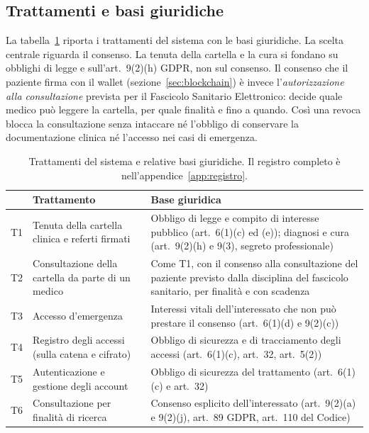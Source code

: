 \subsection{Trattamenti e basi giuridiche}\label{sec:basi}
La tabella~\ref{tab:basi} riporta i trattamenti del sistema con le basi giuridiche. La scelta centrale riguarda il consenso. La tenuta della cartella e la cura si fondano su obblighi di legge e sull'art.~9(2)(h) GDPR, non sul consenso. Il consenso che il paziente firma con il wallet (sezione~\ref{sec:blockchain}) è invece l'\emph{autorizzazione alla consultazione} prevista per il Fascicolo Sanitario Elettronico: decide quale medico può leggere la cartella, per quale finalità e fino a quando. Così una revoca blocca la consultazione senza intaccare né l'obbligo di conservare la documentazione clinica né l'accesso nei casi di emergenza.

\begin{table}[H]
\centering\footnotesize
\renewcommand{\arraystretch}{1.2}
\begin{tabular}{@{}l p{} p{}@{}}
\toprule
& Trattamento & Base giuridica\\
\midrule
T1 & Tenuta della cartella clinica e referti firmati & Obbligo di legge e compito di interesse pubblico (art.~6(1)(c) ed (e)); diagnosi e cura (art.~9(2)(h) e 9(3), segreto professionale)\\
T2 & Consultazione della cartella da parte di un medico & Come T1, con il consenso alla consultazione del paziente previsto dalla disciplina del fascicolo sanitario, per finalità e con scadenza\\
T3 & Accesso d'emergenza & Interessi vitali dell'interessato che non può prestare il consenso (art.~6(1)(d) e 9(2)(c))\\
T4 & Registro degli accessi (sulla catena e cifrato) & Obbligo di sicurezza e di tracciamento degli accessi (art.~6(1)(c), art.~32, art.~5(2))\\
T5 & Autenticazione e gestione degli account & Obbligo di sicurezza del trattamento (art.~6(1)(c) e art.~32)\\
T6 & Consultazione per finalità di ricerca & Consenso esplicito dell'interessato (art.~9(2)(a) e 9(2)(j), art.~89 GDPR, art.~110 del Codice)\\
\bottomrule
\end{tabular}
\caption{Trattamenti del sistema e relative basi giuridiche. Il registro completo è nell'appendice~\ref{app:registro}.}\label{tab:basi}
\end{table}

